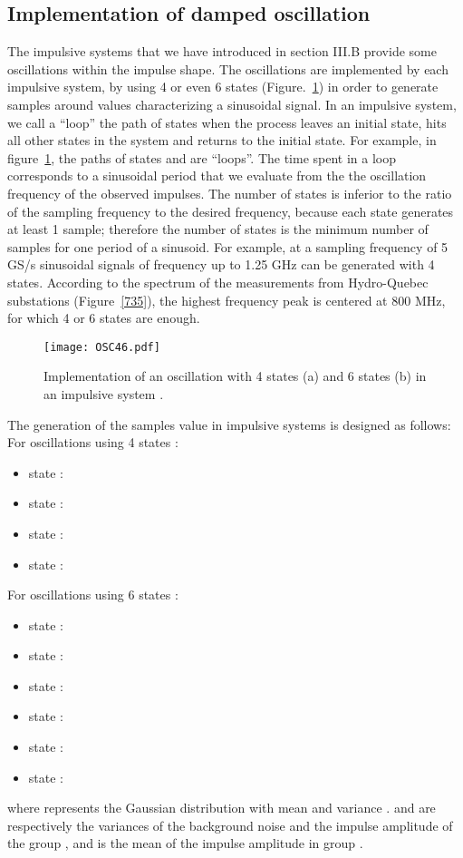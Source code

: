\documentclass[journal]{IEEEtran}
\begin{document}
\subsection{Implementation of damped oscillation}
The impulsive systems that we have introduced in section III.B provide some oscillations within the impulse shape. The oscillations are implemented by each impulsive system, by using 4 or even 6 states (Figure.~\ref{OSC46}) in order to generate samples around values characterizing a sinusoidal signal. In an impulsive system, we call a ``loop'' the path of states when the process leaves an initial state, hits all other states in the system and returns to the initial state. For example, in figure~\ref{OSC46}, the paths of states  and  are ``loops''. The time spent in a loop corresponds to a sinusoidal period that we evaluate from the the oscillation frequency of the observed impulses. The number of states is inferior to the ratio of the sampling frequency to the desired frequency, because each state generates at least 1 sample; therefore the number of states is the minimum number of samples for one period of a sinusoid. For example, at a sampling frequency of 5 GS/s sinusoidal signals of frequency up to 1.25 GHz can be generated with 4 states. According to the spectrum of the measurements from Hydro-Quebec substations (Figure~\ref{735}), the highest frequency peak is centered at 800 MHz, for which 4 or 6 states are enough.
\begin{figure}
\texttt{[image: OSC46.pdf]}\\
  \caption{Implementation of an oscillation with 4 states (a) and 6 states (b) in an impulsive system .}\label{OSC46}
\end{figure}

The generation of the samples value in impulsive systems is designed as follows:\\
For oscillations using 4 states :
\begin{itemize}
  \item state  :  
  \item state  :  
  \item state  :  
  \item state  :  
\end{itemize}
For oscillations using 6 states :
\begin{itemize}
  \item state  :  
  \item state  :  
  \item state  :  
  \item state  :  
  \item state  :  
  \item state  :  
\end{itemize}
where  represents the Gaussian distribution with mean  and variance .  and  are respectively the variances of the background noise and the impulse amplitude of the group , and  is the mean of the impulse amplitude in group .
\end{document}
